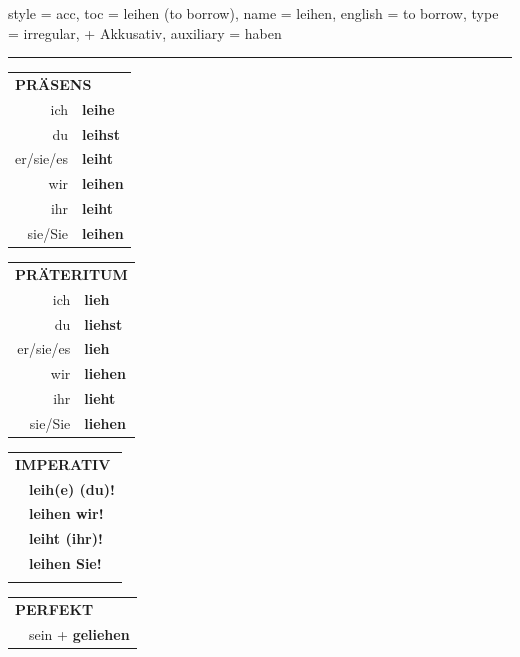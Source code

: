 \begin{verbentry}{
  style = {acc},
  toc = {leihen (to borrow)},
  name = {leihen},
  english = {to borrow},
  type = {irregular, + Akkusativ},
  auxiliary = {haben}
}
 
    
     \vspace{5pt}

    \hrule
    
    \vspace{5pt}

  \begin{tabular}{rl}
     \multicolumn{2}{l}{\textbf{PRÄSENS} }\\
    ich & \textbf{leihe}\\
    du & \textbf{leihst}\\
    er/sie/es & \textbf{leiht}\\
    wir & \textbf{leihen}\\
    ihr & \textbf{leiht}\\
    sie/Sie & \textbf{leihen}\\
  \end{tabular}
  \hfill
     \begin{tabular}{rl}
    \multicolumn{2}{l}{\textbf{PRÄTERITUM} }\\
    ich & \textbf{lieh}\\
    du & \textbf{liehst}\\
    er/sie/es & \textbf{lieh}\\
    wir & \textbf{liehen}\\
    ihr & \textbf{lieht}\\
    sie/Sie & \textbf{liehen}\\
  \end{tabular}
  \hfill
  \begin{tabular}{rl}
     \multicolumn{2}{l}{\textbf{IMPERATIV} }\\
   & \textbf{leih(e) (du)!}\\
   & \textbf{leihen wir!}\\
   & \textbf{leiht (ihr)!}\\
   & \textbf{leihen Sie!}\\
   & \vspace{10pt}
  \end{tabular}

    \vspace{10pt}

 \begin{tabular}{rl}
     \multicolumn{2}{l}{\textbf{PERFEKT}}\\
   & sein + \textbf{geliehen}\\
  \end{tabular}
\hfill
   \begin{tabular}{rl}
   

\end{tabular}
\end{verbentry}
